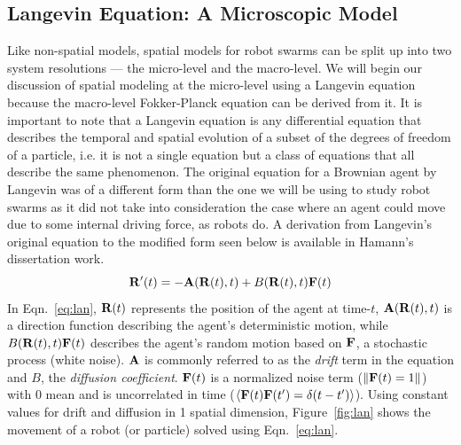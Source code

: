 \documentclass[Main.tex]{subfiles}
\begin{document}
\subsection{Langevin Equation: A Microscopic Model}
Like non-spatial models, spatial models for robot swarms can be split up into two system resolutions --- the micro-level and the macro-level. We will begin our discussion of spatial modeling at the micro-level using a Langevin equation because the macro-level Fokker-Planck equation can be derived from it. It is important to note that a Langevin equation is any differential equation that describes the temporal and spatial evolution of a subset of the degrees of freedom of a particle, i.e. it is not a single equation but a class of equations that all describe the same phenomenon. The original equation for a Brownian agent by Langevin was of a different form than the one we will be using to study robot swarms as it did not take into consideration the case where an agent could move due to some internal driving force, as robots do. A derivation from Langevin's original equation to the modified form seen below is available in Hamann's dissertation work\cite{Hamann2010}.
\begin{equation}\label{eq:lan}
\mathbf{R}'(t) = -\mathbf{A}(\mathbf{R}(t),t) + B(\mathbf{R}(t),t)\mathbf{F}(t)
\end{equation}
In Eqn.~\eqref{eq:lan}, $\mathbf{R}(t)$ represents the position of the agent at time-$t$, $\mathbf{A}(\mathbf{R}(t),t)$ is a direction function describing the agent's deterministic motion, while $B(\mathbf{R}(t),t)\mathbf{F}(t)$ describes the agent's random motion based on $\mathbf{F}$, a stochastic process (white noise). $\mathbf{A}$ is commonly referred to as the \emph{drift} term in the equation and $B$, the \emph{diffusion coefficient}. $\mathbf{F}(t)$ is a normalized noise term ($\lVert\mathbf{F}(t) = 1\rVert$) with 0 mean and is uncorrelated in time ($\left<\mathbf{F}(t)\mathbf{F}(t') = \delta(t - t')\right>$). Using constant values for drift and diffusion in 1 spatial dimension, Figure~\ref{fig:lan} shows the movement of a robot (or particle) solved using Eqn.~\eqref{eq:lan}.
\end{document}
